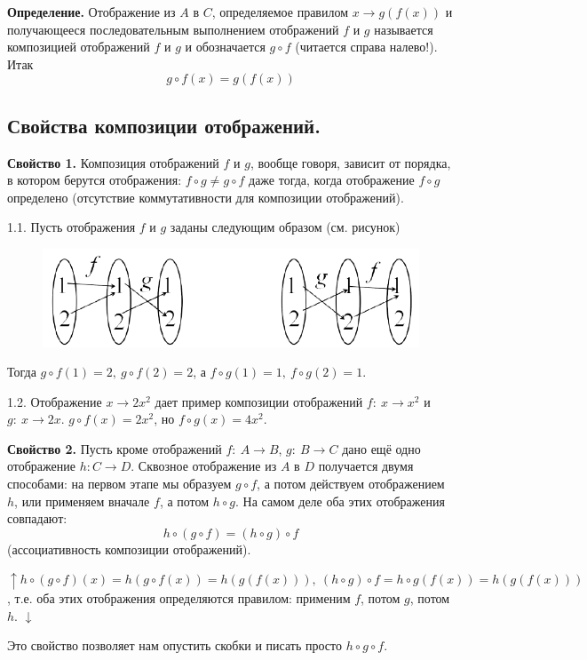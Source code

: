\documentclass{article}
\begin{document}
    \textbf{Определение.} Отображение из $A$ в $C$, определяемое правилом $x \rightarrow g(f(x))$ и получающееся последовательным выполнением отображений $f$ и $g$ называется композицией отображений $f$ и $g$ и обозначается $g \circ f$ (читается справа налево!). Итак
    \[g \circ f(x) = g(f(x))\]

    \subsection{Свойства композиции отображений.}
    
    \textbf{Свойство 1.} Композиция отображений $f$ и $g$, вообще говоря, зависит от порядка, в котором берутся отображения: $f \circ g \neq g \circ f$ даже тогда, когда отображение $f \circ g$ определено (отсутствие коммутативности для композиции отображений).

    1.1. Пусть отображения $f$ и $g$ заданы следующим образом (см. рисунок)

    \begin{figure}[h!]
    \centering
    \includegraphics[scale=0.5]{3}
    \end{figure}

    Тогда $g \circ f(1) = 2,\ g \circ f(2) = 2$, а $f \circ g(1) = 1,\ f \circ g(2) = 1$.

    1.2. Отображение $x \rightarrow 2x^2$ дает пример композиции отображений $f:\ x \rightarrow x^2$ и $g:\ x \rightarrow 2x$. $g \circ f(x) = 2x^2$, но $f \circ g(x) = 4x^2$.

    \textbf{Свойство 2.} Пусть кроме отображений $f:\ A \rightarrow B$, $g:\ B \rightarrow C$ дано ещё одно отображение $h: C \rightarrow D$. Сквозное отображение из $A$ в $D$ получается двумя способами: на первом этапе мы образуем $g \circ f$, а потом действуем отображением $h$, или применяем вначале $f$, а потом $h \circ g$. На самом деле оба этих отображения совпадают:
    \[h \circ (g \circ f) = (h \circ g) \circ f\]
    (ассоциативность композиции отображений).

    $\uparrow h \circ (g \circ f)(x) = h(g \circ f(x)) = h(g(f(x))),\ (h \circ g) \circ f = h \circ g(f(x)) = h(g(f(x)))$, т.е. оба этих отображения определяются правилом: применим $f$, потом $g$, потом $h$. $\downarrow$

    Это свойство позволяет нам опустить скобки и писать просто $h \circ g \circ f$.

\end{document}
